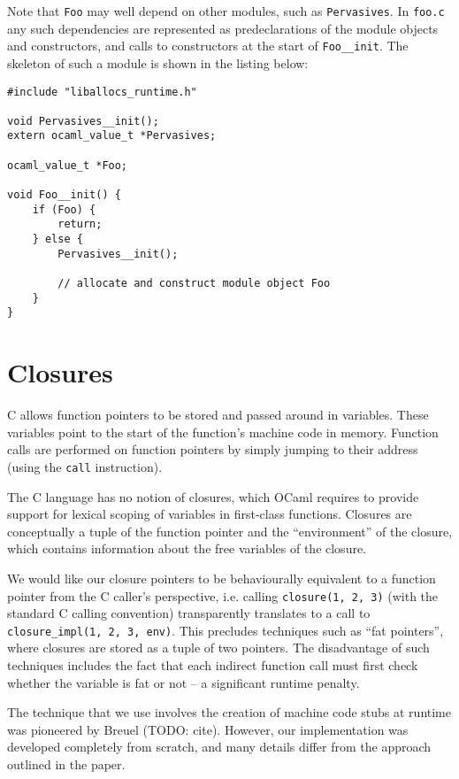 \documentclass[12pt,a4paper,twoside,openright]{report}
\begin{document}
Note that \lstinline!Foo! may well depend on other modules, such as \lstinline!Pervasives!. In \lstinline!foo.c! any such dependencies are represented as predeclarations of the module objects and constructors, and calls to constructors at the start of \lstinline!Foo__init!. The skeleton of such a module is shown in the listing below:

\begin{lstlisting}
#include "liballocs_runtime.h"

void Pervasives__init();
extern ocaml_value_t *Pervasives;

ocaml_value_t *Foo;

void Foo__init() {
    if (Foo) {
        return;
    } else {
        Pervasives__init();

        // allocate and construct module object Foo
    }
}
\end{lstlisting}

\section{Closures}

C allows function pointers to be stored and passed around in variables. These variables point to the start of the function's machine code in memory. Function calls are performed on function pointers by simply jumping to their address (using the \lstinline{call} instruction).

The C language has no notion of closures, which OCaml requires to provide support for lexical scoping of variables in first-class functions. Closures are conceptually a tuple of the function pointer and the ``environment'' of the closure, which contains information about the free variables of the closure.

We would like our closure pointers to be behaviourally equivalent to a function pointer from the C caller's perspective, i.e. calling
\lstinline{closure(1, 2, 3)}
(with the standard C calling convention) transparently translates to a call to
\lstinline{closure_impl(1, 2, 3, env)}. This precludes techniques such as ``fat pointers'', where closures are stored as a tuple of two pointers. The disadvantage of such techniques includes the fact that each indirect function call must first check whether the variable is fat or not -- a significant runtime penalty.

The technique that we use involves the creation of machine code stubs at runtime was pioneered by Breuel (TODO: cite). However, our implementation was developed completely from scratch, and many details differ from the approach outlined in the paper.
\end{document}
